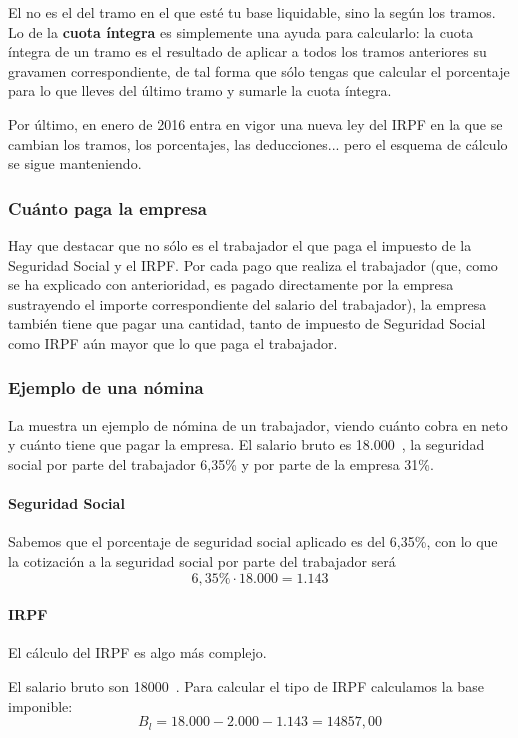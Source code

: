 \documentclass[nochap,palatino,shortheader]{apuntes}
\begin{document}
El  no es el del tramo en el que esté tu base liquidable, sino la  según los tramos.
Lo de la \textbf{cuota íntegra} es simplemente una ayuda para calcularlo: la cuota íntegra de un tramo es el resultado de aplicar a todos los tramos anteriores su gravamen correspondiente, de tal forma que sólo tengas que calcular el porcentaje para lo que lleves del último tramo y sumarle la cuota íntegra.

Por último, en enero de 2016 entra en vigor una nueva ley del IRPF en la que se cambian los tramos, los porcentajes, las deducciones... pero el esquema de cálculo se sigue manteniendo.

\subsubsection{Cuánto paga la empresa}
Hay que destacar que no sólo es el trabajador el que paga el impuesto de la Seguridad Social y el IRPF. Por cada pago que realiza el trabajador (que, como se ha explicado con anterioridad, es pagado directamente por la empresa sustrayendo el importe correspondiente del salario del trabajador), la empresa también tiene que pagar una cantidad, tanto de impuesto de Seguridad Social como IRPF aún mayor que lo que paga el trabajador.

\subsubsection{Ejemplo de una nómina}
La  muestra un ejemplo de nómina de un trabajador, viendo cuánto cobra en neto y cuánto tiene que pagar la empresa. El salario bruto es 18.000\texteuro\ , la seguridad social por parte del trabajador 6,35\% y por parte de la empresa 31\%.


\paragraph{Seguridad Social}
Sabemos que el porcentaje de seguridad social aplicado es del 6,35\%, con lo que la cotización a la seguridad social por parte del trabajador será 
\[6,35\% · 18.000 = 1.143\]

\paragraph{IRPF} El cálculo del IRPF es algo más complejo.


El salario bruto son 18000\texteuro\ . Para calcular el tipo de IRPF calculamos la base imponible:
\[
B_l = 18.000 - 2.000 - 1.143 = 14857,00
\]
\end{document}

